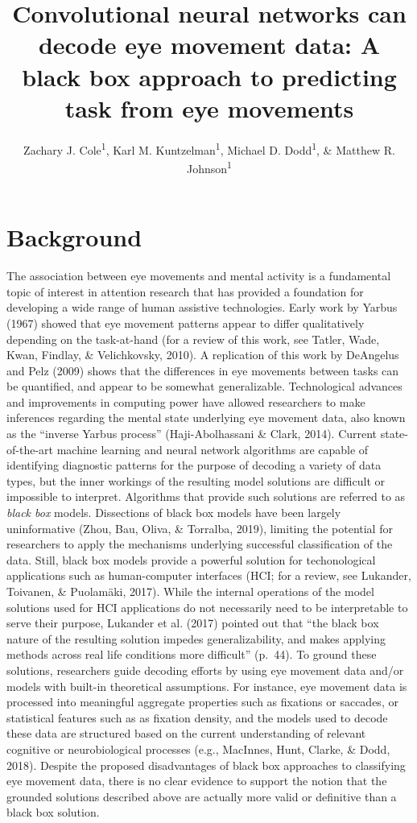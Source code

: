 \documentclass[
  english,
  man,floatsintext]{apa6}
\author{Zachary J. Cole\textsuperscript{1}, Karl M. Kuntzelman\textsuperscript{1}, Michael D. Dodd\textsuperscript{1}, \& Matthew R. Johnson\textsuperscript{1}}
\affiliation{
\vspace{0.5cm}
\textsuperscript{1} University of Nebraska-Lincoln}
\title{Convolutional neural networks can decode eye movement data: A black box approach to predicting task from eye movements}
\date{}
\begin{document}
\maketitle

\section{Background}

The association between eye movements and mental activity is a fundamental topic of interest in attention research that has provided a foundation for developing a wide range of human assistive technologies. Early work by Yarbus (1967) showed that eye movement patterns appear to differ qualitatively depending on the task-at-hand (for a review of this work, see Tatler, Wade, Kwan, Findlay, \& Velichkovsky, 2010). A replication of this work by DeAngelus and Pelz (2009) shows that the differences in eye movements between tasks can be quantified, and appear to be somewhat generalizable. Technological advances and improvements in computing power have allowed researchers to make inferences regarding the mental state underlying eye movement data, also known as the \enquote{inverse Yarbus process} (Haji-Abolhassani \& Clark, 2014). Current state-of-the-art machine learning and neural network algorithms are capable of identifying diagnostic patterns for the purpose of decoding a variety of data types, but the inner workings of the resulting model solutions are difficult or impossible to interpret. Algorithms that provide such solutions are referred to as \emph{black box} models. Dissections of black box models have been largely uninformative (Zhou, Bau, Oliva, \& Torralba, 2019), limiting the potential for researchers to apply the mechanisms underlying successful classification of the data. Still, black box models provide a powerful solution for techonological applications such as human-computer interfaces (HCI; for a review, see Lukander, Toivanen, \& Puolamäki, 2017). While the internal operations of the model solutions used for HCI applications do not necessarily need to be interpretable to serve their purpose, Lukander et al. (2017) pointed out that \enquote{the black box nature of the resulting solution impedes generalizability, and makes applying methods across real life conditions more difficult} (p.~44). To ground these solutions, researchers guide decoding efforts by using eye movement data and/or models with built-in theoretical assumptions. For instance, eye movement data is processed into meaningful aggregate properties such as fixations or saccades, or statistical features such as as fixation density, and the models used to decode these data are structured based on the current understanding of relevant cognitive or neurobiological processes (e.g., MacInnes, Hunt, Clarke, \& Dodd, 2018). Despite the proposed disadvantages of black box approaches to classifying eye movement data, there is no clear evidence to support the notion that the grounded solutions described above are actually more valid or definitive than a black box solution.
\end{document}
